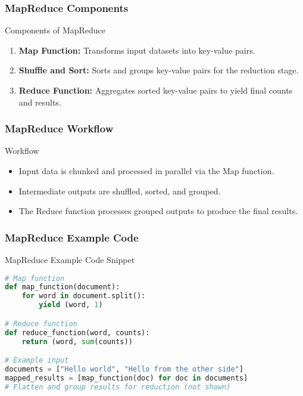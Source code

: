 \documentclass[aspectratio=169]{beamer}
\begin{document}
\begin{frame}[fragile]
    \frametitle{MapReduce Components}
    \begin{block}{Components of MapReduce}
        \begin{enumerate}
            \item \textbf{Map Function:} Transforms input datasets into key-value pairs.
            \item \textbf{Shuffle and Sort:} Sorts and groups key-value pairs for the reduction stage.
            \item \textbf{Reduce Function:} Aggregates sorted key-value pairs to yield final counts and results.
        \end{enumerate}
    \end{block}
\end{frame}

\begin{frame}[fragile]
    \frametitle{MapReduce Workflow}
    \begin{block}{Workflow}
        \begin{itemize}
            \item Input data is chunked and processed in parallel via the Map function.
            \item Intermediate outputs are shuffled, sorted, and grouped.
            \item The Reduce function processes grouped outputs to produce the final results.
        \end{itemize}
    \end{block}
\end{frame}

\begin{frame}[fragile]
    \frametitle{MapReduce Example Code}
    \begin{block}{MapReduce Example Code Snippet}
        \begin{lstlisting}[language=Python]
# Map function
def map_function(document):
    for word in document.split():
        yield (word, 1)

# Reduce function
def reduce_function(word, counts):
    return (word, sum(counts))

# Example input
documents = ["Hello world", "Hello from the other side"]
mapped_results = [map_function(doc) for doc in documents]
# Flatten and group results for reduction (not shown)
        \end{lstlisting}
    \end{block}
\end{frame}
\end{document}
